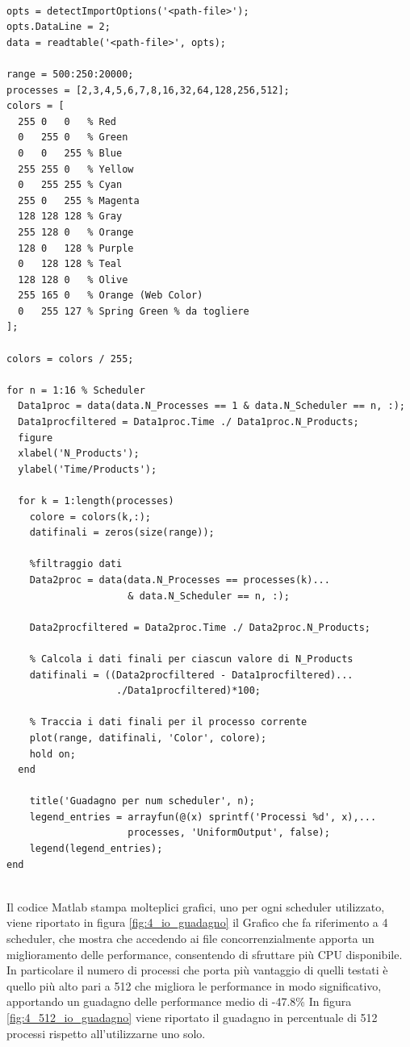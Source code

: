 \begin{lstlisting}[language=none,captionpos=b,
	caption={Guadagno rispetto ad un processo},label={lst:guadagno_matlab}]

opts = detectImportOptions('<path-file>');
opts.DataLine = 2;
data = readtable('<path-file>', opts);

range = 500:250:20000;
processes = [2,3,4,5,6,7,8,16,32,64,128,256,512];
colors = [
  255 0   0   % Red
  0   255 0   % Green
  0   0   255 % Blue
  255 255 0   % Yellow
  0   255 255 % Cyan
  255 0   255 % Magenta
  128 128 128 % Gray
  255 128 0   % Orange
  128 0   128 % Purple
  0   128 128 % Teal
  128 128 0   % Olive
  255 165 0   % Orange (Web Color)
  0   255 127 % Spring Green % da togliere
];

colors = colors / 255;

for n = 1:16 % Scheduler
  Data1proc = data(data.N_Processes == 1 & data.N_Scheduler == n, :);
  Data1procfiltered = Data1proc.Time ./ Data1proc.N_Products;
  figure
  xlabel('N_Products');
  ylabel('Time/Products');

  for k = 1:length(processes)
    colore = colors(k,:);
    datifinali = zeros(size(range));

    %filtraggio dati
    Data2proc = data(data.N_Processes == processes(k)... 
	                 & data.N_Scheduler == n, :);

    Data2procfiltered = Data2proc.Time ./ Data2proc.N_Products;  

    % Calcola i dati finali per ciascun valore di N_Products  
    datifinali = ((Data2procfiltered - Data1procfiltered)... 
	               ./Data1procfiltered)*100;

    % Traccia i dati finali per il processo corrente
    plot(range, datifinali, 'Color', colore);
    hold on;
  end

	title('Guadagno per num scheduler', n);
	legend_entries = arrayfun(@(x) sprintf('Processi %d', x),... 
                     processes, 'UniformOutput', false);
	legend(legend_entries);
end


\end{lstlisting}


Il codice Matlab stampa molteplici grafici, uno per ogni scheduler
utilizzato, viene riportato in figura \ref{fig:4_io_guadagno}
il Grafico che fa riferimento a 4 scheduler, che mostra che accedendo
ai file concorrenzialmente apporta un miglioramento delle performance,
consentendo di sfruttare più CPU disponibile.
In particolare il numero di processi che porta più vantaggio
di quelli testati è
quello più alto pari a 512 che migliora le performance in modo
significativo, apportando un guadagno delle performance medio
di -47.8\%
In figura \ref{fig:4_512_io_guadagno} viene riportato il guadagno
in percentuale di 512 processi rispetto all'utilizzarne uno solo.



